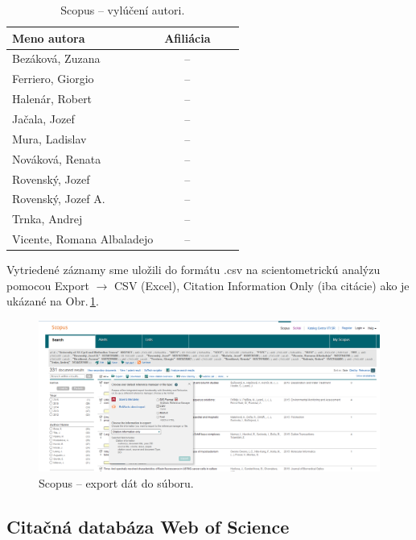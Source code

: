 \begin{table}
\centering\small
\begin{tabular}{lccc}
  \hline\noalign{\vspace{.3ex}}
  Meno autora                & Afiliácia \\[0.3ex]
  \hline\noalign{\vspace{.5ex}}
  Bezáková, Zuzana           & -- \\
  Ferriero, Giorgio          & -- \\
  Halenár, Robert            & -- \\
  Jačala, Jozef              & -- \\
  Mura, Ladislav             & -- \\[1ex]
  Nováková, Renata           & -- \\
  Rovenský, Jozef            & -- \\
  Rovenský, Jozef A.         & -- \\
  Trnka, Andrej              & -- \\
  Vicente, Romana Albaladejo & -- \\[0.5ex]
  \hline
\end{tabular}
\caption{Scopus -- vylúčení autori.}
\label{tab:scopus.exauthors}
\end{table}

Vytriedené záznamy sme uložili do formátu .csv na scientometrickú analýzu pomocou Export $\rightarrow$ CSV (Excel), Citation Information Only (iba citácie) ako je ukázané na Obr.\,\ref{fig:scopus.export}.

\begin{figure}
  \centering
  \includegraphics[width=\textwidth]{obr/scopus10-cut.jpg}
  \caption{Scopus -- export dát do súboru.}
  \label{fig:scopus.export}
\end{figure}


\subsection{Citačná databáza Web of Science}

